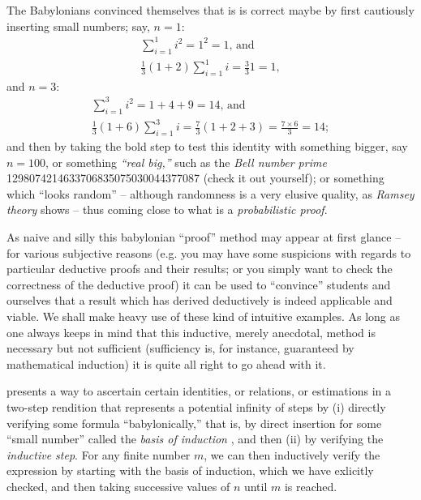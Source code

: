 The Babylonians convinced themselves that is is correct maybe by first cautiously inserting small numbers; say,  $n=1$:
\begin{equation*}
\begin{split}
\sum_{i=1}^1 i^2 = 1^2 = 1\text{, and}\\
\frac{1}{3}\left(1+2\right)\sum_{i=1}^1 i =\frac{3}{3} 1 = 1,
\end{split}
\end{equation*}
and $n=3$:
\begin{equation*}
\begin{split}
\sum_{i=1}^3 i^2 = 1+4+9=14
\text{, and}\\
\frac{1}{3}\left(1+6\right)\sum_{i=1}^3 i =\frac{7}{3}(1+2+3)=\frac{7\times 6}{3}=14;
\end{split}
\end{equation*}
and then by taking the bold step to test this identity with something bigger, say $n=100$, or something {\em ``real big,''}
such as the {\em Bell number prime} 1298074214633706835075030044377087 (check it out yourself);
or something which ``looks random'' -- although randomness is a very elusive quality, as {\em Ramsey theory}
shows --
thus coming close to what is a {\em probabilistic proof}.

As naive and silly this babylonian ``proof'' method may appear at first glance  -- for various subjective reasons
(e.g. you may have some suspicions with regards to particular deductive proofs and their results; or you simply want to check the correctness of the deductive proof)
it can be used to ``convince'' students and ourselves that
a result which has derived deductively is indeed applicable and viable.
We shall make heavy use of these kind of intuitive examples.
As long as one always keeps in mind that this inductive, merely anecdotal, method is necessary but not sufficient
(sufficiency is, for instance, guaranteed by mathematical induction) it is quite all right to go ahead with it.

 presents a way to ascertain certain identities, or relations, or estimations
in a two-step rendition that represents a potential infinity of
steps by (i)  directly verifying some formula ``babylonically,''
that is,  by direct insertion for some ``small number'' called the {\em basis of induction}
, and then (ii) by verifying the {\em inductive step}.
For any finite number $m$, we can then inductively verify the expression by starting with the basis of induction, which we have exlicitly checked,
and then taking successive values of $n$ until $m$ is reached.

